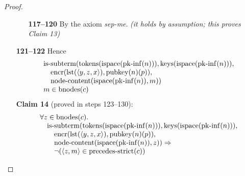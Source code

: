 \documentclass[11pt]{article}
\theoremstyle{plain}
\begin{document}
\begin{proof}
\begin{itemize}[leftmargin=2.8em, itemsep=4pt, parsep=1pt]
  \begin{itemize}[leftmargin=2.8em, itemsep=4pt, parsep=1pt]
  \item[\textbf{117--120}] By the axiom \emph{sep-me}.  \emph{(it holds by assumption; this proves Claim 13)}
  \end{itemize}
  \item[\textbf{121--122}] Hence 
\begin{equation*}
\begin{array}{@{}l@{}}
\begin{array}{@{}l@{}} \operatorname{is\text{-}subterm}(\operatorname{tokens}(\operatorname{ispace}(\operatorname{pk\text{-}inf}(n))), \operatorname{keys}(\operatorname{ispace}(\operatorname{pk\text{-}inf}(n))), \\ \quad \operatorname{encr}(\operatorname{lst}(\langle y, z, x \rangle), \operatorname{pubkey}(n)(p)), \\ \quad \operatorname{node\text{-}content}(\operatorname{ispace}(\operatorname{pk\text{-}inf}(n)), m)) \end{array} \\
m \in \operatorname{bnodes}(c)
\end{array}
\end{equation*}
\textbf{Claim 14} (proved in steps 123--130):
\begin{equation*}
\begin{array}{@{}l@{}} \forall z \in \operatorname{bnodes}(c). \\ \quad \operatorname{is\text{-}subterm}(\operatorname{tokens}(\operatorname{ispace}(\operatorname{pk\text{-}inf}(n))), \operatorname{keys}(\operatorname{ispace}(\operatorname{pk\text{-}inf}(n))), \\ \quad \quad \operatorname{encr}(\operatorname{lst}(\langle y, z, x \rangle), \operatorname{pubkey}(n)(p)), \\ \quad \quad \operatorname{node\text{-}content}(\operatorname{ispace}(\operatorname{pk\text{-}inf}(n)), z)) \Rightarrow \\ \quad \quad \neg (\langle z, m \rangle \in \operatorname{precedes\text{-}strict}(c)) \end{array}
\end{equation*}


\end{itemize}
\end{proof}
\end{document}
